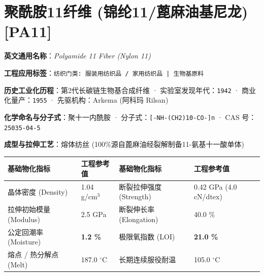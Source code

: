 \documentclass[11pt,openright,twoside,UTF8]{ctexbook}
\begin{document}
\section{聚酰胺11纤维 (锦纶11/蓖麻油基尼龙) [PA11]}
\label{sec:pa11}

\noindent\textbf{英文通用名称}：\textit{Polyamide 11 Fiber (Nylon 11)}\par
\noindent\textbf{工程应用标签}：\texttt{纺织门类: 服装用纺织品 / 家用纺织品 | 生物基原料}\par
\noindent\textbf{历史工业化历程}：第2代长碳链生物基合成纤维 · 实验室发现年代：\texttt{1942} · 商业化量产：\texttt{1955} · 先驱机构：Arkema (阿科玛 Rilsan)\par
\noindent\textbf{化学命名与分子式}：聚十一内酰胺 · 分子式：\texttt{[-NH-(CH2)10-CO-]n} · CAS 号：\texttt{25035-04-5}\par
\noindent\textbf{成型与拉伸工艺}：熔体纺丝 (100\%源自蓖麻油经裂解制备11-氨基十一酸单体)\par

\vspace{0.15cm}
\begin{center}
\small
\begin{tabularx}{\textwidth}{p{3.8cm}Xp{3.8cm}X}
\toprule
\textbf{基础物化指标} & \textbf{工程参考值} & \textbf{基础物化指标} & \textbf{工程参考值} \\
\midrule
晶体密度 (Density) & 1.04 g/cm$^3$ & 断裂拉伸强度 (Strength) & 0.42 GPa (4.0 cN/dtex) \\
拉伸初始模量 (Modulus) & 2.5 GPa & 断裂伸长率 (Elongation) & 40.0 \% \\
公定回潮率 (Moisture) & \textbf{1.2 \%} & 极限氧指数 (LOI) & \textbf{21.0 \%} \\
熔点 / 热分解点 (Melt) & 187.0 $^\circ\mathrm{C}$ & 长期连续服役耐温 & 105.0 $^\circ\mathrm{C}$ \\
\bottomrule
\end{tabularx}
\end{center}
\vspace{0.15cm}
\end{document}
